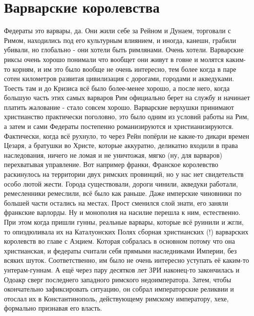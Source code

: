 \section{Варварские королевства}

Федераты это варвары, да. Они жили себе за Рейном и Дунаем, торговали с Римом, находились под его культурным влиянием, и иногда, канешн, грабили убивали, но глобально - они хотели быть римлянами. Очень хотели. Варварские риксы очень хорошо понимали что вообщет они живут в говне и молятся каким-то корням, и им это было вообще не очень интересно, тем более когда в паре сотен километров развитая цивилизация с дорогами, городами и акведуками. Тоесть там и до Кризиса всё было более-менее хорошо, а после него, когда большую часть этих самых варваров Рим официально берет на службу и начинает платить жалование - стало совсем хорошо. Варварские верхушки принимают христианство практически поголовно, это было одним из условий работы на Рим, а затем и сами Федераты постепенно романизируются и христианизируются. Фактически, когда всё рухнуло, то через Рейн попёрли не какие-то дикари времен Цезаря, а братушки во Христе, которые аккуратно, деликатно входили в права наследования, ничего не ломая и не уничтожая, мягко (ну, для варваров) перехватывая управление. Вот например франки, Франское королевство раскинулось на территории двух римских провинций, но у нас нет свидетельств особо лютой жести. Города существовали, дороги чинили, акведуки работали, ремесленники ремеслили, всё было как раньше. Даже имперские чиновники по большей части остались на местах. Прост сменился слой знати, его заняли франкские варлорды. Ну и монополия на насилие перешла к ним, естественно. При этом когда пришли гунны, реальные варвары, которые всё руинили и жгли, то опиздюливала их на Каталуонских Полях сборная христианских (!) варварских королевств во главе с Аэцием. Которая собралась в основном потому что она христианская, и федераты считали себя прямыми наследниками Империи, без всяких шуток. Соответственно, им было не очень интересно уступать её каким-то унтерам-гуннам. А ещё через пару десятков лет ЗРИ наконец-то закончилась и Одоакр сверг последнего западного римского недоимператора. Затем, чтобы окончательно зафиксировать ситуацию, он собрал императорские реликвии и отослал их в Константинополь, действующему римскому императору, хехе, формально признавая его власть. 

